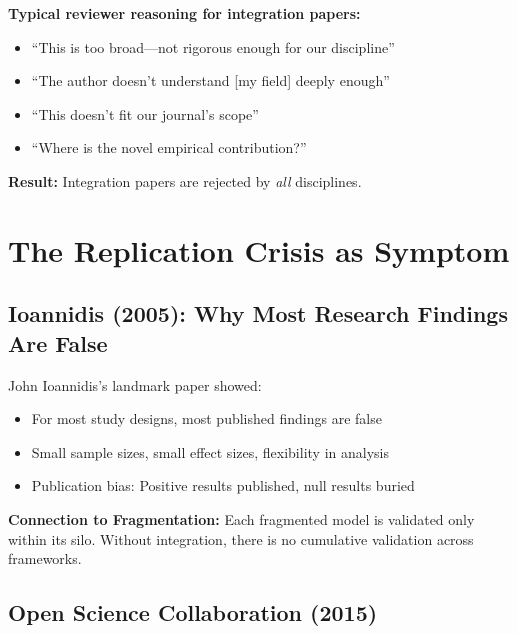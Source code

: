 \begin{tcolorbox}[colback=yellow!5!white, colframe=yellow!75!black]
\textbf{Typical reviewer reasoning for integration papers:}
\begin{itemize}
\item ``This is too broad—not rigorous enough for our discipline''
\item ``The author doesn't understand [my field] deeply enough''
\item ``This doesn't fit our journal's scope''
\item ``Where is the novel empirical contribution?''
\end{itemize}

\textbf{Result:} Integration papers are rejected by \textit{all} disciplines.
\end{tcolorbox}



\section{The Replication Crisis as Symptom}
\label{sec:meta-replication}

\subsection{Ioannidis (2005): Why Most Research Findings Are False}

John Ioannidis's landmark paper showed:
\begin{itemize}
\item For most study designs, most published findings are false
\item Small sample sizes, small effect sizes, flexibility in analysis
\item Publication bias: Positive results published, null results buried
\end{itemize}

\textbf{Connection to Fragmentation:}
Each fragmented model is validated only within its silo. Without integration, there is no cumulative validation across frameworks.

\subsection{Open Science Collaboration (2015)}

